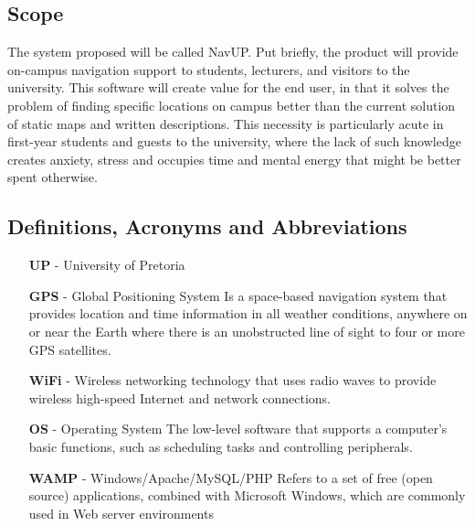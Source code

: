 \documentclass[12pt,a4paper]{article}
\begin{document}


		\subsection{Scope}

			The system proposed will be called NavUP. Put briefly, the product will
			provide on-campus navigation support to students, lecturers, and visitors to
			the university. This software will create value for the end user, in that
			it solves the problem of finding specific locations on campus better than
			the current solution of static maps and written descriptions. This
			necessity is particularly acute in first-year students and guests to the
			university, where the lack of such knowledge creates anxiety, stress and
			occupies time and mental energy that might be better spent otherwise.

		\subsection{Definitions, Acronyms and Abbreviations}
			\begin{itemize}
				\item [\textbf{UP}] - University of Pretoria
				
				\item [\textbf{GPS}] - Global Positioning System \newline
				 Is a space-based navigation system that provides location and time information 
				 in all weather conditions, anywhere on or near the Earth where there is an 
				 unobstructed line of sight to four or more GPS satellites.
				 
				\item [\textbf{WiFi}] - \newline
				Wireless networking technology that uses radio waves to provide wireless 
				high-speed Internet and network connections.
				
				\item [\textbf{OS}] - Operating System \newline
				The low-level software that supports a computer's basic functions, such as 
				scheduling tasks and controlling peripherals.
				
				\item [\textbf{WAMP}] - Windows/Apache/MySQL/PHP \newline
				Refers to a set of free (open source) applications, combined with Microsoft 
				Windows, which are commonly used in Web server environments
				

\end{itemize}
\end{document}
\end{itemize}
\end{document}
